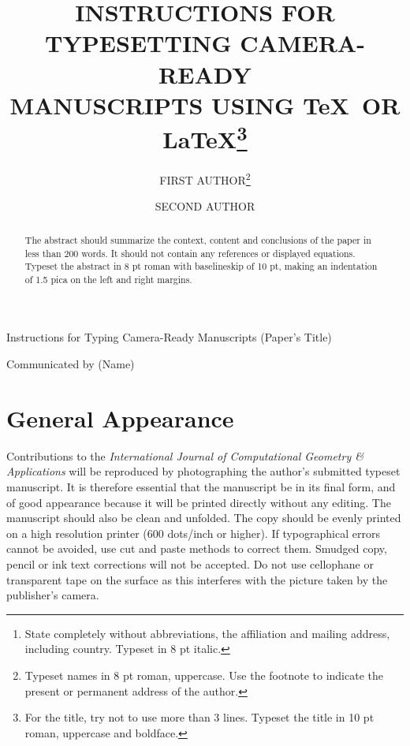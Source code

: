 \documentclass{ws-ijcga}
\begin{document}
{Instructions for Typing Camera-Ready Manuscripts (Paper's Title)}

\catchline

\title{INSTRUCTIONS FOR TYPESETTING CAMERA-READY \\
MANUSCRIPTS USING \TeX\ OR \LaTeX\footnote{For the title, try not to use 
more than 3 lines. Typeset the title in 10 pt roman, uppercase and
boldface.}
}

\author{FIRST AUTHOR\footnote{
Typeset names in 8 pt roman, uppercase. Use the footnote to indicate the
present or permanent address of the author.}}

\address{University Department, University Name, Address\\
City, State ZIP/Zone,Country\,\footnote{State completely without 
abbreviations, the affiliation and mailing address, 
including country. Typeset in 8 pt italic.}\\
e-mail address
}

\author{SECOND AUTHOR}

\address{Group, Laboratory, Address\\
City, State ZIP/Zone, Country\\
e-mail address
}

\maketitle

{Communicated by (Name)}

\begin{abstract}
The abstract should summarize the context, content
and conclusions of the paper in less than 200 words. It should
not contain any references or displayed equations. Typeset the
abstract in 8 pt roman with baselineskip of 10 pt, making
an indentation of 1.5 pica on the left and right margins.

\end{abstract}

\section{General Appearance}	%

Contributions to the {\it International Journal of Computational Geometry 
\& Applications} will be reproduced by photographing the author's
submitted typeset manuscript. It is therefore essential that the
manuscript be in its final form, and of good appearance because
it will be printed directly without any editing. The manuscript
should also be clean and unfolded. The copy should be evenly
printed on a high resolution printer (600 dots/inch or higher).
If typographical errors cannot be avoided, use cut and paste
methods to correct them. Smudged copy, pencil or ink text
corrections will not be accepted. Do not use cellophane or
transparent tape on the surface as this interferes with the
picture taken by the publisher's camera.
\end{document}
